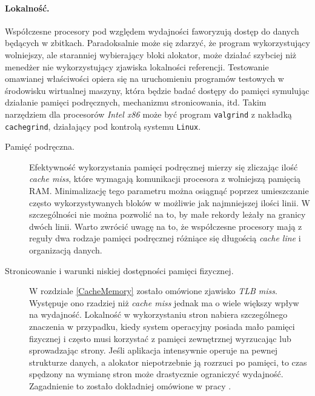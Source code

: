 \documentclass[12pt,a4paper,titlepage,twoside]{mwart}
\begin{document}
\paragraph{Lokalność.} Współczesne procesory pod względem wydajności faworyzują
dostęp do danych będących w zbitkach. Paradoksalnie może się zdarzyć, że
program wykorzystujący wolniejszy, ale staranniej wybierający bloki alokator,
może działać szybciej niż menedżer nie wykorzystujący zjawiska lokalności
referencji. Testowanie omawianej właściwości opiera się na uruchomieniu
programów testowych w środowisku wirtualnej maszyny, która będzie badać dostępy
do pamięci symulując działanie pamięci podręcznych, mechanizmu stronicowania,
itd. Takim narzędziem dla procesorów \textit{Intel x86} może być program
\texttt{valgrind} z nakładką \texttt{cachegrind}, działający pod kontrolą
systemu \texttt{Linux}. 

\begin{description}

\item[Pamięć podręczna.] Efektywność wykorzystania pamięci podręcznej mierzy
się zliczając ilość \textit{cache miss}, które wymagają komunikacji procesora z
wolniejszą pamięcią RAM. Minimalizację tego parametru można osiągnąć poprzez
umieszczanie często wykorzystywanych bloków w możliwie jak najmniejszej ilości
linii. W szczególności nie można pozwolić na to, by małe rekordy leżały na
granicy dwóch linii. Warto zwrócić uwagę na to, że współczesne procesory mają z
reguły dwa rodzaje pamięci podręcznej różniące się długością \textit{cache line} i
organizacją danych.

\vspace{1ex}

\item[Stronicowanie i warunki niskiej dostępności pamięci fizycznej.] W
rozdziale \ref{CacheMemory} zostało omówione zjawisko \textit{TLB miss}.
Występuje ono rzadziej niż \textit{cache miss} jednak ma o wiele większy wpływ
na wydajność. Lokalność w wykorzystaniu stron nabiera szczególnego znaczenia w
przypadku, kiedy system operacyjny posiada mało pamięci fizycznej i często musi
korzystać z pamięci zewnętrznej wyrzucając lub sprowadzając strony. Jeśli
aplikacja intensywnie operuje na pewnej strukturze danych, a alokator
niepotrzebnie ją rozrzuci po pamięci, to czas spędzony na wymianę stron może
drastycznie ograniczyć wydajność. Zagadnienie to zostało dokładniej omówione w
pracy \cite{feng05localityimproving}.

\end{description}
\end{document}
